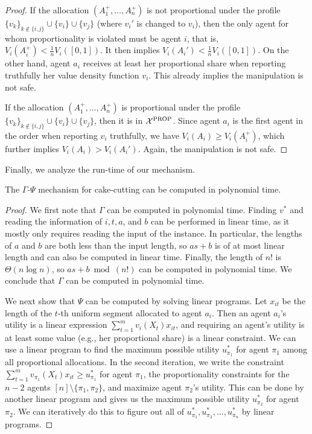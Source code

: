 \begin{proof}
If the allocation $(A_1^+,\ldots,A_n^+)$ is not proportional under the profile $\{v_k\}_{k\notin\{i,j\}}\cup\{v_i\}\cup\{v_j\}$ (where $v_i'$ is changed to $v_i$), then the only agent for whom proportionality is violated must be agent $i$, that is,$V_i(A_i^+)<\frac1nV_i([0,1])$.
It then implies $V_i(A_i')<\frac1nV_i([0,1])$.
On the other hand, agent $a_i$ receives at least her proportional share when reporting truthfully her value density function $v_i$.
This already implies the manipulation is not safe.

If the allocation $(A_1^+,\ldots,A_n^+)$ is proportional under the profile $\{v_k\}_{k\notin\{i,j\}}\cup\{v_i\}\cup\{v_j\}$, then it is in $\mathcal{X}^{\mathrm{PROP}}$.
Since agent $a_i$ is the first agent in the order when reporting $v_i$ truthfully, we have $V_i(A_i)\geq V_i(A_i^+)$, which further implies $V_i(A_i)>V_i(A_i')$.
Again, the manipulation is not safe.
\end{proof}

Finally, we analyze the run-time of our mechanism.
\begin{propositionrep}
The $\Gamma$-$\Psi$ mechanism for cake-cutting can be computed in polynomial time.
\end{propositionrep}
\begin{proof}
We first note that $\Gamma$ can be computed in polynomial time.
Finding $v^\ast$ and reading the information of $i,t,a$, and $b$ can be performed in linear time, as it mostly only requires reading the input of the instance.
In particular, the lengths of $a$ and $b$ are both less than the input length, so $as+b$ is of at most linear length and can also be computed in linear time.
Finally, the length of $n!$ is $\Theta(n\log n)$, so $as+b \bmod (n!)$ can be computed in polynomial time.
We conclude that $\Gamma$ can be computed in polynomial time.

We next show that $\Psi$ can be computed by solving linear programs.
Let $x_{it}$ be the length of the $t$-th uniform segment allocated to agent $a_i$.
Then an agent $a_i$'s utility is a linear expression $\sum_{t=1}^mv_{i}(X_t)x_{it}$, and requiring an agent's utility is at least some value (e.g., her proportional share) is a linear constraint.
We can use a linear program to find the maximum possible utility $u_{\pi_1}^\ast$ for agent $\pi_1$ among all proportional allocations.
In the second iteration, we write the constraint $\sum_{t=1}^mv_{\pi_1}(X_t)x_{it}\geq u_{\pi_1}^\ast$ for agent $\pi_1$, the proportionality constraints for the $n-2$ agents $[n]\setminus\{\pi_1,\pi_2\}$, and maximize agent $\pi_2$'s utility.
This can be done by another linear program and gives us the maximum possible utility $u_{\pi_2}^\ast$ for agent $\pi_2$.
We can iteratively do this to figure out all of $u_{\pi_1}^\ast,u_{\pi_2}^\ast,\ldots,u_{\pi_n}^\ast$ by linear programs. 
\end{proof}

